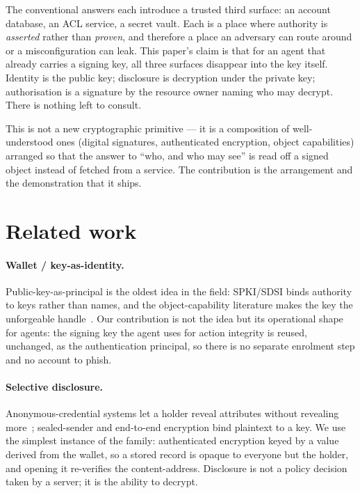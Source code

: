 \documentclass[11pt]{article}
\begin{document}
The conventional answers each introduce a trusted third surface: an account
database, an ACL service, a secret vault. Each is a place where authority is
\emph{asserted} rather than \emph{proven}, and therefore a place an adversary can
route around or a misconfiguration can leak. This paper's claim is that for an agent
that already carries a signing key, all three surfaces disappear into the key
itself. Identity is the public key; disclosure is decryption under the private key;
authorisation is a signature by the resource owner naming who may decrypt. There is
nothing left to consult.

This is not a new cryptographic primitive --- it is a composition of well-understood
ones (digital signatures, authenticated encryption, object capabilities) arranged so
that the answer to ``who, and who may see'' is read off a signed object instead of
fetched from a service. The contribution is the arrangement and the demonstration
that it ships.

\section{Related work}

\paragraph{Wallet / key-as-identity.} Public-key-as-principal is the oldest idea in
the field: SPKI/SDSI binds authority to keys rather than names, and the
object-capability literature makes the key the unforgeable handle~\cite{ocap}. Our
contribution is not the idea but its operational shape for agents: the signing key
the agent uses for action integrity is reused, unchanged, as the authentication
principal, so there is no separate enrolment step and no account to phish.

\paragraph{Selective disclosure.} Anonymous-credential systems let a holder reveal
attributes without revealing more~\cite{camlys}; sealed-sender and end-to-end
encryption bind plaintext to a key. We use the simplest instance of the family:
authenticated encryption keyed by a value derived from the wallet, so a stored
record is opaque to everyone but the holder, and opening it re-verifies the
content-address. Disclosure is not a policy decision taken by a server; it is the
ability to decrypt.
\end{document}
